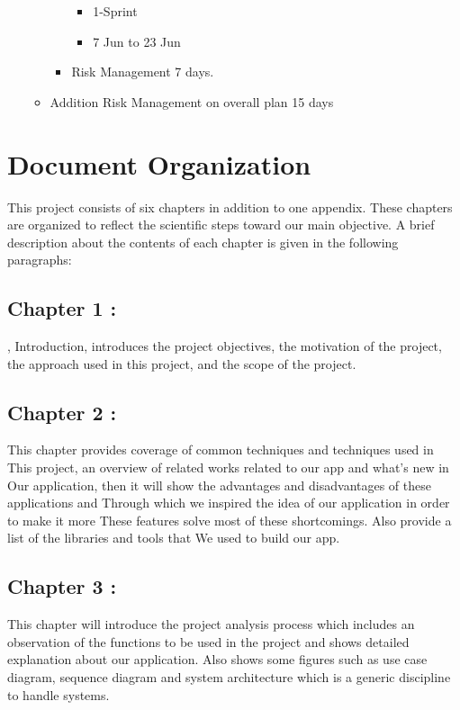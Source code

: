 \begin{itemize}
\begin{itemize}
\begin{itemize}
                        \begin{itemize}
                          \item 1-Sprint
                          \item 7 Jun to 23 Jun
                       \end{itemize}
                    \item Risk Management 7 days.
                \end{itemize}
           \item Addition Risk Management on overall plan 15 days 
       \end{itemize}
     \end{itemize}
\section{Document Organization }
This project consists of six chapters in addition to one appendix. These chapters are organized to reflect the scientific steps toward our main objective. A brief description about the contents of each chapter is given in the following paragraphs:
\subsection{Chapter 1 :}, Introduction, introduces the project objectives, the motivation of the project, the approach used in this project, and the scope of the project.
\subsection{Chapter 2 :}This chapter provides coverage of common techniques and techniques used in This project, an overview of related works related to our app and what's new in Our application, then it will show the advantages and disadvantages of these applications and Through which we inspired the idea of our application in order to make it more These features solve most of these shortcomings. Also provide a list of the libraries and tools that We used to build our app.
\subsection{Chapter 3 :}This chapter will introduce the project analysis process which includes an observation of the functions to be used in the project and shows detailed explanation about our application. Also shows some figures such as use case diagram, sequence diagram and system architecture which is a generic discipline to handle systems. 
